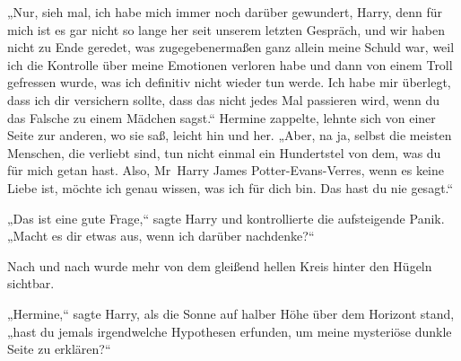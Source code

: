 „Nur, sieh mal, ich habe mich immer noch darüber gewundert, Harry, denn für mich ist es gar nicht so lange her seit unserem letzten Gespräch, und wir haben nicht zu Ende geredet, was zugegebenermaßen ganz allein meine Schuld war, weil ich die Kontrolle über meine Emotionen verloren habe und dann von einem Troll gefressen wurde, was ich definitiv nicht wieder tun werde. Ich habe mir überlegt, dass ich dir versichern sollte, dass das nicht jedes Mal passieren wird, wenn du das Falsche zu einem Mädchen sagst.“
Hermine zappelte, lehnte sich von einer Seite zur anderen, wo sie saß, leicht hin und her.
„Aber, na ja, selbst die meisten Menschen, die verliebt sind, tun nicht einmal ein Hundertstel von dem, was du für mich getan hast. Also, Mr~Harry James Potter-Evans-Verres, wenn es keine Liebe ist, möchte ich genau wissen, was ich für dich bin. Das hast du nie gesagt.“

„Das ist eine gute Frage,“ sagte Harry und kontrollierte die aufsteigende Panik. „Macht es dir etwas aus, wenn ich darüber nachdenke?“

Nach und nach wurde mehr von dem gleißend hellen Kreis hinter den Hügeln sichtbar.

„Hermine,“ sagte Harry, als die Sonne auf halber Höhe über dem Horizont stand,
„hast du jemals irgendwelche Hypothesen erfunden, um meine mysteriöse dunkle Seite zu erklären?“

